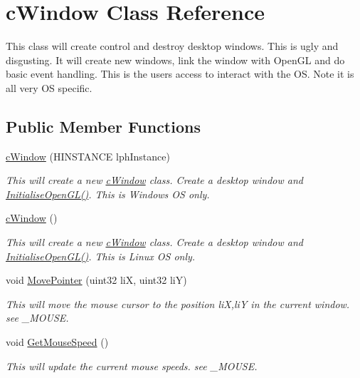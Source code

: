 \hypertarget{classc_window}{
\section{cWindow Class Reference}
\label{classc_window}
}


This class will create control and destroy desktop windows. This is ugly and disgusting. It will create new windows, link the window with OpenGL and do basic event handling. This is the users access to interact with the OS. Note it is all very OS specific.  


\subsection*{Public Member Functions}
\begin{DoxyCompactItemize}
\item 
\hyperlink{classc_window_ae87d783f8bc3e30f751764ac6b078c38}{cWindow} (HINSTANCE lphInstance)
\begin{DoxyCompactList}\small\item\em This will create a new \hyperlink{classc_window}{cWindow} class. Create a desktop window and \hyperlink{classc_window_a41bf3f9e63c0d3d010fb97472f1d20a2}{InitialiseOpenGL()}. This is Windows OS only. \item\end{DoxyCompactList}\item 
\hyperlink{classc_window_a240840abcf5c64260f5fb43474f70084}{cWindow} ()
\begin{DoxyCompactList}\small\item\em This will create a new \hyperlink{classc_window}{cWindow} class. Create a desktop window and \hyperlink{classc_window_a41bf3f9e63c0d3d010fb97472f1d20a2}{InitialiseOpenGL()}. This is Linux OS only. \item\end{DoxyCompactList}\item 
void \hyperlink{classc_window_afa140a737ae105dc72a7e2e99af4b8f7}{MovePointer} (uint32 liX, uint32 liY)
\begin{DoxyCompactList}\small\item\em This will move the mouse cursor to the position liX,liY in the current window. see \_\-MOUSE. \item\end{DoxyCompactList}\item 
void \hyperlink{classc_window_a1911c146862b46992d6e0387fb164b2b}{GetMouseSpeed} ()
\begin{DoxyCompactList}\small\item\em This will update the current mouse speeds. see \_\-MOUSE. \item\end{DoxyCompactList}\item 

\end{DoxyCompactItemize}
